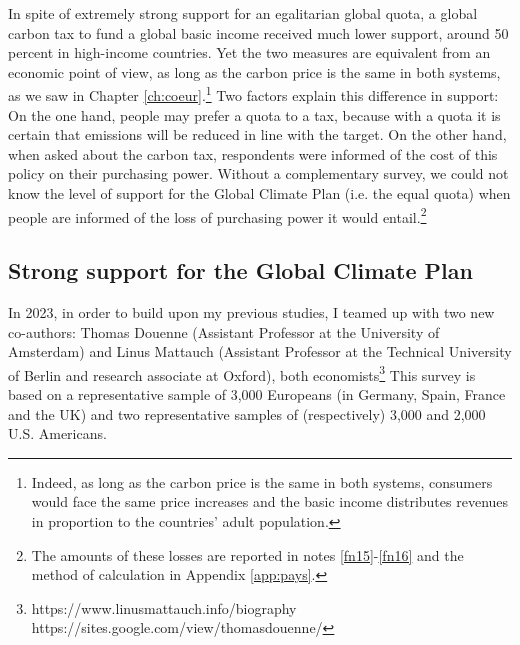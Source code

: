 \documentclass[a5paper,english,openany]{memoir}
\begin{document}
In spite of %
extremely strong support for an egalitarian global quota, a global carbon tax to fund a global basic income received much %
lower support, around 50 percent in high-income countries. Yet the two measures are equivalent from an economic point of view, as long as the carbon price is the same in both systems, as we saw in Chapter \ref{ch:coeur}.\footnote{Indeed, as long as the carbon price is the same in both systems, consumers would face the same price increases %
and the basic income distributes revenues in proportion to the countries' adult population.}  
Two factors explain this difference in support: %
On the one hand, people may prefer a quota to a tax, because with a quota it is certain that emissions will be reduced in line with the target. On the other hand, when asked about the carbon tax, respondents were informed of the cost of this policy on their purchasing power. Without a complementary survey, we could not know the level of support for the Global Climate Plan (i.e. the equal quota) when people are informed of the loss of purchasing power it would entail.\footnote{The amounts of these losses are reported in notes \ref{fn15}-\ref{fn16} and the method of calculation in Appendix \ref{app:pays}.}   


\subsection*{Strong support for the Global Climate Plan}

In 2023, in order to build upon my previous studies, I teamed up with two new co-authors: Thomas Douenne (Assistant Professor at the University of Amsterdam) and Linus Mattauch (Assistant Professor at the Technical University of Berlin and research associate at Oxford), both economists\footnote{https://www.linusmattauch.info/biography  https://sites.google.com/view/thomasdouenne/} %
This survey is based on a representative sample of 3,000 Europeans (in Germany, Spain, France and the UK) and two representative samples of (respectively) 3,000 and 2,000 U.S. Americans. 
\end{document}
